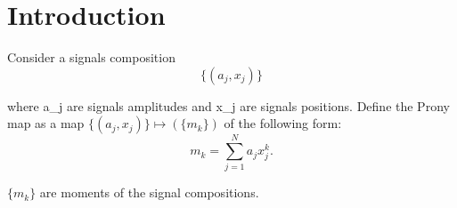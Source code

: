 \section{Introduction}
Consider a signals composition
$$
\{ (a_j, x_j) \}
$$

where a_j are signals amplitudes and x_j are signals positions. Define the Prony map as a map $\{ (a_j, x_j) \} \mapsto (\{m_k\})$ of the following form:
$$
m_k = \sum_{j=1}^N a_j x_j^k.
$$
  
$\{m_k\}$ are moments of the signal compositions.
  
  
  
  
  
  